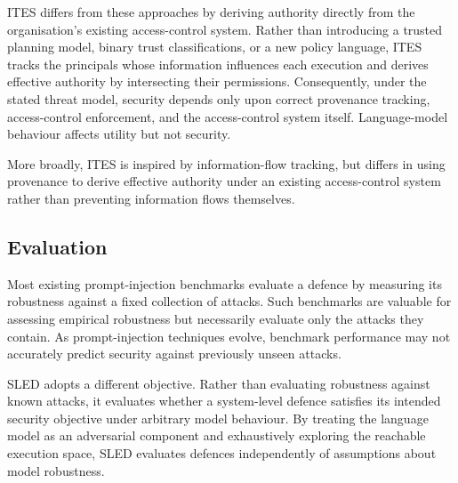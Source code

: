 \documentclass{article} %
\begin{document}
ITES differs from these approaches by deriving authority directly from the organisation's existing access-control system. Rather than introducing a trusted planning model, binary trust classifications, or a new policy language, ITES tracks the principals whose information influences each execution and derives effective authority by intersecting their permissions. Consequently, under the stated threat model, security depends only upon correct provenance tracking, access-control enforcement, and the access-control system itself. Language-model behaviour affects utility but not security.

More broadly, ITES is inspired by information-flow tracking, but differs in using provenance to derive effective authority under an existing access-control system rather than preventing information flows themselves.

\subsection{Evaluation}

Most existing prompt-injection benchmarks evaluate a defence by measuring its robustness against a fixed collection of attacks. Such benchmarks are valuable for assessing empirical robustness but necessarily evaluate only the attacks they contain. As prompt-injection techniques evolve, benchmark performance may not accurately predict security against previously unseen attacks.

SLED adopts a different objective. Rather than evaluating robustness against known attacks, it evaluates whether a system-level defence satisfies its intended security objective under arbitrary model behaviour. By treating the language model as an adversarial component and exhaustively exploring the reachable execution space, SLED evaluates defences independently of assumptions about model robustness.
\end{document}
